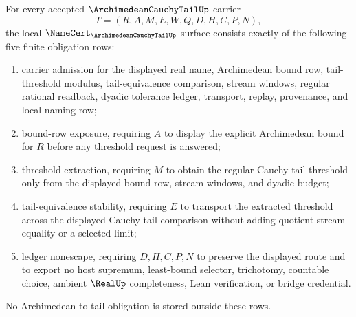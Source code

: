 \begin{theorem}
\label{thm:archimedean-cauchy-tail-namecert-obligations}
For every accepted $\ArchimedeanCauchyTailUp$ carrier
$$
T=(R,A,M,E,W,Q,D,H,C,P,N),
$$
the local $\NameCert_{\ArchimedeanCauchyTailUp}$ surface consists exactly of the following five finite obligation rows:
\begin{enumerate}
\item carrier admission for the displayed real name, Archimedean bound row, tail-threshold modulus, tail-equivalence comparison, stream windows, regular rational readback, dyadic tolerance ledger, transport, replay, provenance, and local naming row;
\item bound-row exposure, requiring $A$ to display the explicit Archimedean bound for $R$ before any threshold request is answered;
\item threshold extraction, requiring $M$ to obtain the regular Cauchy tail threshold only from the displayed bound row, stream windows, and dyadic budget;
\item tail-equivalence stability, requiring $E$ to transport the extracted threshold across the displayed Cauchy-tail comparison without adding quotient stream equality or a selected limit;
\item ledger nonescape, requiring $D,H,C,P,N$ to preserve the displayed route and to export no host supremum, least-bound selector, trichotomy, countable choice, ambient $\RealUp$ completeness, Lean verification, or bridge credential.
\end{enumerate}
No Archimedean-to-tail obligation is stored outside these rows.
\end{theorem}

